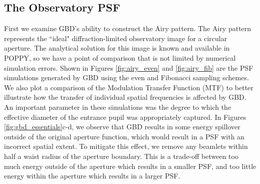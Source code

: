 \subsection{The Observatory PSF}
First we examine GBD's ability to construct the Airy pattern. The Airy pattern represents the ``ideal" diffraction-limited observatory image for a circular aperture. The analytical solution for this image is known and available in POPPY, so we have a point of comparison that is not limited by numerical simulation errors. Shown in Figures \ref{fig:airy_even} and \ref{fig:airy_fib} are the PSF simulations generated by GBD using the even and Fibonacci sampling schemes. We also plot a comparison of the Modulation Transfer Function (MTF) to better illustrate how the transfer of individual spatial frequencies is affected by GBD. An important parameter in these simulations was the degree to which the effective diameter of the entrance pupil was appropriately captured. In Figures \ref{fig:gbd_essentials}c-d, we observe that GBD results in some energy spillover outside of the original aperture function, which would result in a PSF with an incorrect spatial extent. To mitigate this effect, we remove any beamlets within half a waist radius of the aperture boundary. This is a trade-off between too much energy outside of the aperture which results in a smaller PSF, and too little energy within the aperture which results in a larger PSF.

